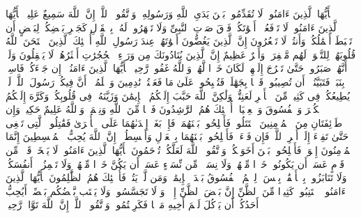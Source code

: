 \stopbuffer%
\startbuffer[\q:49:1]
یَٰۤأَیُّهَا ٱلَّذِینَ ءَامَنُوا۟ لَا تُقَدِّمُوا۟ بَیۡنَ یَدَیِ ٱللَّهِ وَرَسُولِهِۦۖ وَٱتَّقُوا۟ ٱللَّهَۚ إِنَّ ٱللَّهَ سَمِیعٌ عَلِیمࣱ%
\stopbuffer%
\startbuffer[\q:49:2]
یَٰۤأَیُّهَا ٱلَّذِینَ ءَامَنُوا۟ لَا تَرۡفَعُوۤا۟ أَصۡوَٰتَكُمۡ فَوۡقَ صَوۡتِ ٱلنَّبِیِّ وَلَا تَجۡهَرُوا۟ لَهُۥ بِٱلۡقَوۡلِ كَجَهۡرِ بَعۡضِكُمۡ لِبَعۡضٍ أَن تَحۡبَطَ أَعۡمَٰلُكُمۡ وَأَنتُمۡ لَا تَشۡعُرُونَ%
\stopbuffer%
\startbuffer[\q:49:3]
إِنَّ ٱلَّذِینَ یَغُضُّونَ أَصۡوَٰتَهُمۡ عِندَ رَسُولِ ٱللَّهِ أُو۟لَٰۤئِكَ ٱلَّذِینَ ٱمۡتَحَنَ ٱللَّهُ قُلُوبَهُمۡ لِلتَّقۡوَىٰۚ لَهُم مَّغۡفِرَةࣱ وَأَجۡرٌ عَظِیمٌ%
\stopbuffer%
\startbuffer[\q:49:4]
إِنَّ ٱلَّذِینَ یُنَادُونَكَ مِن وَرَاۤءِ ٱلۡحُجُرَٰتِ أَكۡثَرُهُمۡ لَا یَعۡقِلُونَ%
\stopbuffer%
\startbuffer[\q:49:5]
وَلَوۡ أَنَّهُمۡ صَبَرُوا۟ حَتَّىٰ تَخۡرُجَ إِلَیۡهِمۡ لَكَانَ خَیۡرࣰا لَّهُمۡۚ وَٱللَّهُ غَفُورࣱ رَّحِیمࣱ%
\stopbuffer%
\startbuffer[\q:49:6]
یَٰۤأَیُّهَا ٱلَّذِینَ ءَامَنُوۤا۟ إِن جَاۤءَكُمۡ فَاسِقُۢ بِنَبَإࣲ فَتَبَیَّنُوۤا۟ أَن تُصِیبُوا۟ قَوۡمَۢا بِجَهَٰلَةࣲ فَتُصۡبِحُوا۟ عَلَىٰ مَا فَعَلۡتُمۡ نَٰدِمِینَ%
\stopbuffer%
\startbuffer[\q:49:7]
وَٱعۡلَمُوۤا۟ أَنَّ فِیكُمۡ رَسُولَ ٱللَّهِۚ لَوۡ یُطِیعُكُمۡ فِی كَثِیرࣲ مِّنَ ٱلۡأَمۡرِ لَعَنِتُّمۡ وَلَٰكِنَّ ٱللَّهَ حَبَّبَ إِلَیۡكُمُ ٱلۡإِیمَٰنَ وَزَیَّنَهُۥ فِی قُلُوبِكُمۡ وَكَرَّهَ إِلَیۡكُمُ ٱلۡكُفۡرَ وَٱلۡفُسُوقَ وَٱلۡعِصۡیَانَۚ أُو۟لَٰۤئِكَ هُمُ ٱلرَّٰشِدُونَ%
\stopbuffer%
\startbuffer[\q:49:8]
فَضۡلࣰا مِّنَ ٱللَّهِ وَنِعۡمَةࣰۚ وَٱللَّهُ عَلِیمٌ حَكِیمࣱ%
\stopbuffer%
\startbuffer[\q:49:9]
وَإِن طَاۤئِفَتَانِ مِنَ ٱلۡمُؤۡمِنِینَ ٱقۡتَتَلُوا۟ فَأَصۡلِحُوا۟ بَیۡنَهُمَاۖ فَإِنۢ بَغَتۡ إِحۡدَىٰهُمَا عَلَى ٱلۡأُخۡرَىٰ فَقَٰتِلُوا۟ ٱلَّتِی تَبۡغِی حَتَّىٰ تَفِیۤءَ إِلَىٰۤ أَمۡرِ ٱللَّهِۚ فَإِن فَاۤءَتۡ فَأَصۡلِحُوا۟ بَیۡنَهُمَا بِٱلۡعَدۡلِ وَأَقۡسِطُوۤا۟ۖ إِنَّ ٱللَّهَ یُحِبُّ ٱلۡمُقۡسِطِینَ%
\stopbuffer%
\startbuffer[\q:49:10]
إِنَّمَا ٱلۡمُؤۡمِنُونَ إِخۡوَةࣱ فَأَصۡلِحُوا۟ بَیۡنَ أَخَوَیۡكُمۡۚ وَٱتَّقُوا۟ ٱللَّهَ لَعَلَّكُمۡ تُرۡحَمُونَ%
\stopbuffer%
\startbuffer[\q:49:11]
یَٰۤأَیُّهَا ٱلَّذِینَ ءَامَنُوا۟ لَا یَسۡخَرۡ قَوۡمࣱ مِّن قَوۡمٍ عَسَىٰۤ أَن یَكُونُوا۟ خَیۡرࣰا مِّنۡهُمۡ وَلَا نِسَاۤءࣱ مِّن نِّسَاۤءٍ عَسَىٰۤ أَن یَكُنَّ خَیۡرࣰا مِّنۡهُنَّۖ وَلَا تَلۡمِزُوۤا۟ أَنفُسَكُمۡ وَلَا تَنَابَزُوا۟ بِٱلۡأَلۡقَٰبِۖ بِئۡسَ ٱلِٱسۡمُ ٱلۡفُسُوقُ بَعۡدَ ٱلۡإِیمَٰنِۚ وَمَن لَّمۡ یَتُبۡ فَأُو۟لَٰۤئِكَ هُمُ ٱلظَّٰلِمُونَ%
\stopbuffer%
\startbuffer[\q:49:12]
یَٰۤأَیُّهَا ٱلَّذِینَ ءَامَنُوا۟ ٱجۡتَنِبُوا۟ كَثِیرࣰا مِّنَ ٱلظَّنِّ إِنَّ بَعۡضَ ٱلظَّنِّ إِثۡمࣱۖ وَ لَا تَجَسَّسُوا۟ وَلَا یَغۡتَب بَّعۡضُكُم بَعۡضًاۚ أَیُحِبُّ أَحَدُكُمۡ أَن یَأۡكُلَ لَحۡمَ أَخِیهِ مَیۡتࣰا فَكَرِهۡتُمُوهُۚ وَٱتَّقُوا۟ ٱللَّهَۚ إِنَّ ٱللَّهَ تَوَّابࣱ رَّحِیمࣱ%
